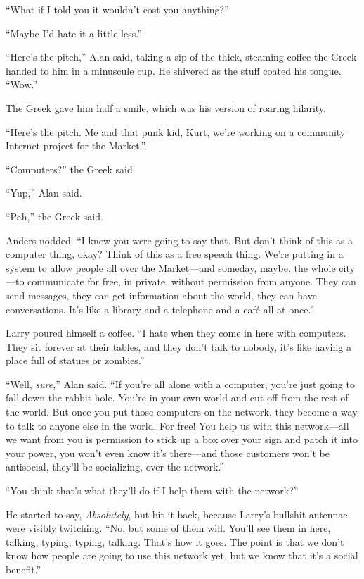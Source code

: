 \documentclass{article}
\begin{document}
``What if I told you it wouldn't cost you anything?''

``Maybe I'd hate it a little less.''

``Here's the pitch,'' Alan said, taking a sip of the thick, steaming
coffee the Greek handed to him in a minuscule cup.  He shivered as the
stuff coated his tongue.  ``Wow.''

The Greek gave him half a smile, which was his version of roaring
hilarity.

``Here's the pitch.  Me and that punk kid, Kurt, we're working on a
community Internet project for the Market.''

``Computers?'' the Greek said.

``Yup,'' Alan said.

``Pah,'' the Greek said.

Anders nodded.  ``I knew you were going to say that.  But don't think
of this as a computer thing, okay?  Think of this as a free speech
thing.  We're putting in a system to allow people all over the
Market---and someday, maybe, the whole city---to communicate for free,
in private, without permission from anyone.  They can send messages,
they can get information about the world, they can have conversations. 
It's like a library and a telephone and a caf\'{e} all at once.''

Larry poured himself a coffee.  ``I hate when they come in here with
computers.  They sit forever at their tables, and they don't talk to
nobody, it's like having a place full of statues or zombies.''

``Well, \textit{sure},'' Alan said.  ``If you're all alone with a
computer, you're just going to fall down the rabbit hole.  You're in
your own world and cut off from the rest of the world.  But once you
put those computers on the network, they become a way to talk to
anyone else in the world.  For free!  You help us with this
network---all we want from you is permission to stick up a box over
your sign and patch it into your power, you won't even know it's
there---and those customers won't be antisocial, they'll be
socializing, over the network.''

``You think that's what they'll do if I help them with the network?''

He started to say, \textit{Absolutely}, but bit it back, because
Larry's bullshit antennae were visibly twitching.  ``No, but some of
them will.  You'll see them in here, talking, typing, typing, talking. 
That's how it goes.  The point is that we don't know how people are
going to use this network yet, but we know that it's a social
benefit.''
\end{document}
